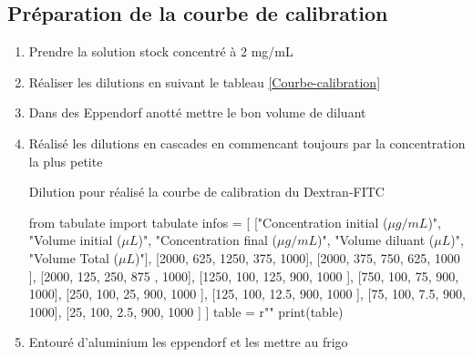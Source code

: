 \subsection{Préparation de la courbe de calibration}

\begin{enumerate}
\item Prendre la solution stock concentré à 2 mg/mL
\item Réaliser les dilutions en suivant le tableau \ref{Courbe-calibration}
\item Dans des Eppendorf anotté mettre le bon volume de diluant
\item Réalisé les dilutions en cascades en commencant toujours par la concentration la plus petite
\begin{table}[H]
\caption{Dilution pour réalisé la courbe de calibration du Dextran-FITC}
\label{Courbe-calibration}
\begin{pycode}

from tabulate import tabulate
infos = [
    ["Concentration initial ($\mu g/mL$)", "Volume initial ($\mu L$)", "Concentration final ($\mu g/mL$)", "Volume diluant ($\mu L$)",  "Volume Total ($\mu L$)"],
    [2000, 625, 1250, 375, 1000],
    [2000, 375, 750, 625, 1000 ],
    [2000, 125, 250, 875 , 1000],
    [1250, 100, 125, 900, 1000 ],
    [750, 100, 75, 900, 1000],
    [250, 100, 25, 900, 1000 ],
    [125, 100, 12.5, 900, 1000 ],
    [75, 100, 7.5, 900, 1000],
    [25, 100, 2.5, 900, 1000 ]
]
table = r""
print(table)
\end{pycode}
\label{table-ensemencement}
\end{table}

\item Entouré d'aluminium les eppendorf et les mettre au frigo
\end{enumerate}